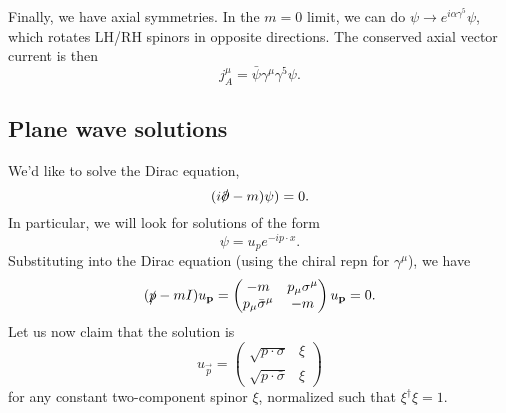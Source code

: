 Finally, we have axial symmetries. In the $m=0$ limit, we can do $\psi \to e^{i\alpha \gamma^5} \psi$, which rotates LH/RH spinors in opposite directions. The conserved axial vector current is then
$$j^\mu_A =\bar \psi \gamma^\mu \gamma^5 \psi.$$

\subsection*{Plane wave solutions} We'd like to solve the Dirac equation,
$$(i\slashed{\p}-m)\psi)=0.$$
In particular, we will look for solutions of the form
$$\psi = u_p e^{-ip\cdot x}.$$
Substituting into the Dirac equation (using the chiral repn for $\gamma^\mu$), we have
\begin{equation}\label{diracplanewave}
(\slashed{p}-m I)u_{\vec p} = \begin{pmatrix} -m & p_\mu \sigma^\mu \\
p_\mu \bar \sigma^\mu & -m
\end{pmatrix} u_{\vec p} =0.
\end{equation}
Let us now claim that the solution is
$$u_{\vec p}=\begin{pmatrix}
    \sqrt{p\cdot \sigma} & \xi\\
    \sqrt{p\cdot \bar \sigma} & \xi
\end{pmatrix}$$
for any constant two-component spinor $\xi$, normalized such that $\xi^\dagger \xi =1$.
